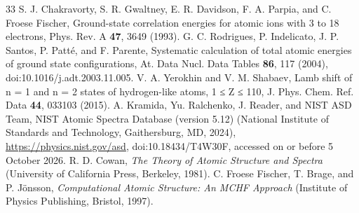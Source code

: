 \documentclass[aps,pra,preprint,notitlepage,superscriptaddress,amsmath,amssymb]{revtex4-2}
\begin{document}
\begin{thebibliography}{33}
 S. J. Chakravorty, S. R. Gwaltney, E. R. Davidson, F. A. Parpia, and C. Froese Fischer, Ground-state correlation energies for atomic ions with 3 to 18 electrons, Phys. Rev. A \textbf{47}, 3649 (1993).
 G. C. Rodrigues, P. Indelicato, J. P. Santos, P. Patté, and F. Parente, Systematic calculation of total atomic energies of ground state configurations, At. Data Nucl. Data Tables \textbf{86}, 117 (2004), doi:10.1016/j.adt.2003.11.005.
 V. A. Yerokhin and V. M. Shabaev, Lamb shift of n = 1 and n = 2 states of hydrogen-like atoms, 1 ≤ Z ≤ 110, J. Phys. Chem. Ref. Data \textbf{44}, 033103 (2015).
 A. Kramida, Yu. Ralchenko, J. Reader, and NIST ASD Team, NIST Atomic Spectra Database (version 5.12) (National Institute of Standards and Technology, Gaithersburg, MD, 2024), \url{https://physics.nist.gov/asd}, doi:10.18434/T4W30F, accessed on or before 5 October 2026.
 R. D. Cowan, \emph{The Theory of Atomic Structure and Spectra} (University of California Press, Berkeley, 1981).
 C. Froese Fischer, T. Brage, and P. Jönsson, \emph{Computational Atomic Structure: An MCHF Approach} (Institute of Physics Publishing, Bristol, 1997).
\end{thebibliography}
\end{document}
